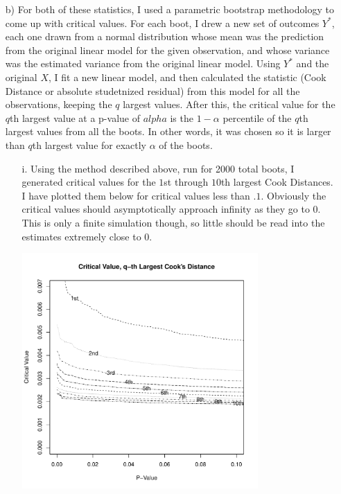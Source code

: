 \documentclass[11pt]{article}
\theoremstyle{definition}
\begin{document}
\begin{itemize}
\begin{itemize}
\begin{itemize}
                \end{itemize}
            \item[b)]
                For both of these statistics, I used a parametric bootstrap methodology to come up with critical values. For each boot, I drew a new set of outcomes $Y^*$, each one drawn from a normal distribution whose mean was the prediction from the original linear model for the given observation, and whose variance was the estimated variance from the original linear model. Using $Y^*$ and the original $X$, I fit a new linear model, and then calculated the statistic (Cook Distance or absolute studetnized residual) from this model for all the observations, keeping the $q$ largest values. After this, the critical value for the $q$th largest value at a p-value of $alpha$ is the $1-\alpha$ percentile of the $q$th largest values from all the boots. In other words, it was chosen so it is larger than $q$th largest value for exactly $\alpha$ of the boots. 
                \begin{itemize}
                    \item[i.]
                        Using the method described above, run for 2000 total boots, I generated critical values for the $1$st through $10$th largest Cook Distances. I have plotted them below for critical values less than $.1$. Obviously the critical values should asymptotically approach infinity as they go to $0$. This is only a finite simulation though, so little should be read into the estimates extremely close to $0$.
                        \begin{center}
                            \includegraphics[width=9cm]{final/2bi_plot} 
                        \end{center}

\end{itemize}
\end{itemize}
\end{itemize}
\end{document}
